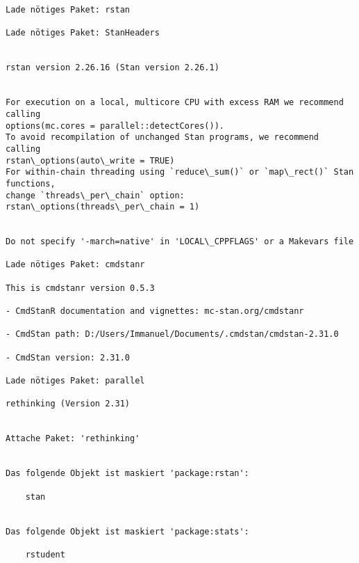 \documentclass[11pt]{article}
\begin{document}
    \begin{Verbatim}[commandchars=\\\{\}]
Lade nötiges Paket: rstan

Lade nötiges Paket: StanHeaders


rstan version 2.26.16 (Stan version 2.26.1)


For execution on a local, multicore CPU with excess RAM we recommend calling
options(mc.cores = parallel::detectCores()).
To avoid recompilation of unchanged Stan programs, we recommend calling
rstan\_options(auto\_write = TRUE)
For within-chain threading using `reduce\_sum()` or `map\_rect()` Stan functions,
change `threads\_per\_chain` option:
rstan\_options(threads\_per\_chain = 1)


Do not specify '-march=native' in 'LOCAL\_CPPFLAGS' or a Makevars file

Lade nötiges Paket: cmdstanr

This is cmdstanr version 0.5.3

- CmdStanR documentation and vignettes: mc-stan.org/cmdstanr

- CmdStan path: D:/Users/Immanuel/Documents/.cmdstan/cmdstan-2.31.0

- CmdStan version: 2.31.0

Lade nötiges Paket: parallel

rethinking (Version 2.31)


Attache Paket: 'rethinking'


Das folgende Objekt ist maskiert 'package:rstan':

    stan


Das folgende Objekt ist maskiert 'package:stats':

    rstudent


    \end{Verbatim}
\end{document}
